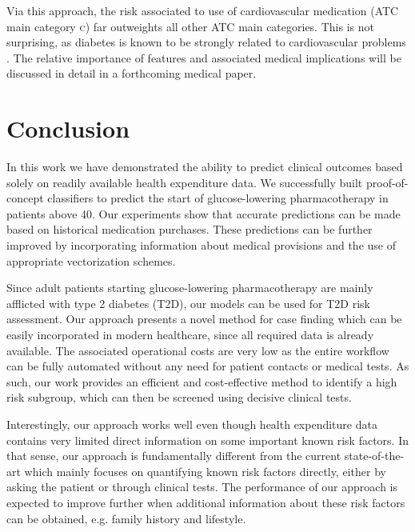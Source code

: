\documentclass[twoside,11pt]{article}
\begin{document}
Via this approach, the risk associated to use of cardiovascular medication (ATC main category \textsc{c}) far outweights all other ATC main categories. This is not surprising, as diabetes is known to be strongly related to cardiovascular problems \citep{doi:10.1001/jama.1979.03290450033020, grundy1999diabetes, hu2002elevated}. The relative importance of features and associated medical implications will be discussed in detail in a forthcoming medical paper.

%
%


\section{Conclusion}
In this work we have demonstrated the ability to predict clinical outcomes based solely on readily available health expenditure data. We successfully built proof-of-concept classifiers to predict the start of glucose-lowering pharmacotherapy in patients above 40. Our experiments show that accurate predictions can be made based on historical medication purchases. These predictions can be further improved by incorporating information about medical provisions and the use of appropriate vectorization schemes.

Since adult patients starting glucose-lowering pharmacotherapy are mainly afflicted with type 2 diabetes (T2D), our models can be used for T2D risk assessment. Our approach presents a novel method for case finding which can be easily incorporated in modern healthcare, since all required data is already available. The associated operational costs are very low as the entire workflow can be fully automated without any need for patient contacts or medical tests. As such, our work provides an efficient and cost-effective method to identify a high risk subgroup, which can then be screened using decisive clinical tests.

Interestingly, our approach works well even though health expenditure data contains very limited direct information on some important known risk factors. In that sense, our approach is fundamentally different from the current state-of-the-art which mainly focuses on quantifying known risk factors directly, either by asking the patient or through clinical tests. The performance of our approach is expected to improve further when additional information about these risk factors can be obtained, e.g. family history and lifestyle.
\end{document}
